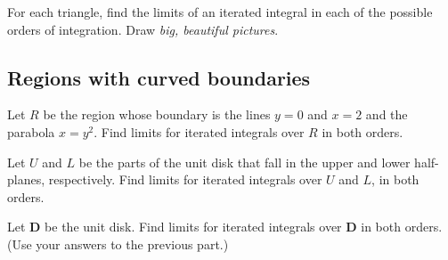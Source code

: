 \documentclass[12pt]{exam}
\theoremstyle{definition}
\begin{document}
\begin{questions}

\question For each triangle, find the limits of an iterated integral in each of the possible orders of integration. Draw \emph{big, beautiful pictures}.


\subsection{Regions with curved boundaries}

\question Let $R$ be the region whose boundary is the lines $y = 0$ and $x = 2$ and the parabola $x = y^2$. Find limits for iterated integrals over $R$ in both orders.


\question Let $U$ and $L$ be the parts of the unit disk that fall in the upper and lower half-planes, respectively. Find limits for iterated integrals over $U$ and $L$, in both orders.


\newpage

\question Let $\mathbf{D}$ be the unit disk. Find limits for iterated integrals over $\mathbf{D}$ in both orders. (Use your answers to the previous part.)



\end{questions}
\end{document}
